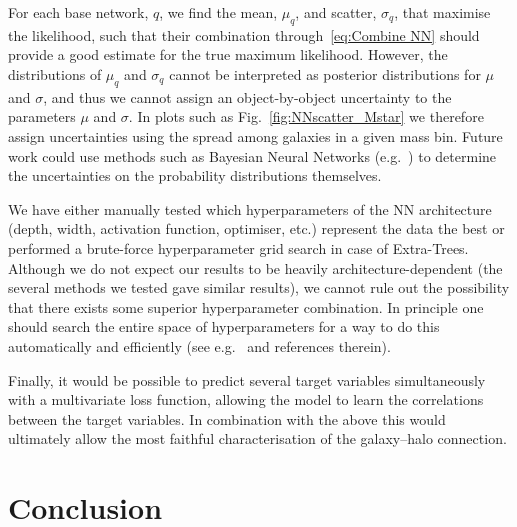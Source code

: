 \documentclass[useAMS,usenatbib]{mnras}
\begin{document}
For each base network, $q$, we find the mean, $\mu_q$, and scatter, $\sigma_q$, that maximise the likelihood, such that their combination through~\cref{eq:Combine NN} should provide a good estimate for the true maximum likelihood. However, the distributions of $\mu_q$ and $\sigma_q$ cannot be interpreted as posterior distributions for $\mu$ and $\sigma$, and thus we cannot assign an object-by-object uncertainty to the parameters $\mu$ and $\sigma$. In plots such as Fig.~\ref{fig:NNscatter_Mstar} we therefore assign uncertainties using the spread among galaxies in a given mass bin. Future work could use methods such as Bayesian Neural Networks (e.g.~\citet{BayesNN}) to determine the uncertainties on the probability distributions themselves.

We have either manually tested which hyperparameters of the NN architecture (depth, width, activation function, optimiser, etc.) represent the data the best or performed a brute-force hyperparameter grid search in case of Extra-Trees. Although we do not expect our results to be heavily architecture-dependent (the several methods we tested gave similar results), we cannot rule out the possibility that there exists some superior hyperparameter combination. In principle one should search the entire space of hyperparameters for a way to do this automatically and efficiently (see e.g.~\citealt{Optuna} and references therein).

Finally, it would be possible to predict several target variables simultaneously with a multivariate loss function, allowing the model to learn the correlations between the target variables. In combination with the above this would ultimately allow the most faithful characterisation of the galaxy--halo connection.


\section{Conclusion}\label{sec:Conclusion}
\end{document}
